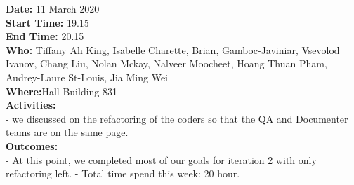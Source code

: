 \documentclass[12pt]{article}
\begin{document}
{\bf Date:} 11 March 2020 \\
{\bf Start Time:} 19.15 \\
{\bf End Time:} 20.15 \\
{\bf Who:} Tiffany Ah King, Isabelle Charette, Brian, Gamboc-Javiniar, Vsevolod Ivanov, Chang Liu, Nolan Mckay, Nalveer Moocheet, Hoang Thuan Pham, Audrey-Laure St-Louis, Jia Ming Wei \\
{\bf Where:}Hall Building 831 \\
{\bf Activities:}\\
- we discussed on the refactoring of the coders so that the QA and Documenter teams are on the same page.\\
{\bf Outcomes:}\\
- At this point, we completed most of our goals for iteration 2 with only refactoring left.
- Total time spend this week: 20 hour.
\end{document}
